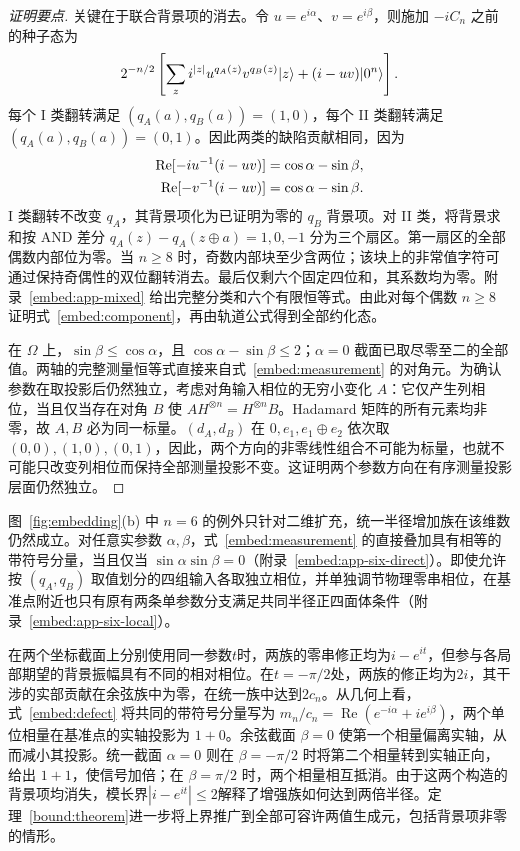 \begin{proof}[证明要点]
关键在于联合背景项的消去。令 $u=e^{i\alpha}$、$v=e^{i\beta}$，则施加 $-iC_n$ 之前的种子态为
\begin{equation}
 2^{-n/2}\left[\sum_z i^{|z|}u^{q_A(z)}v^{q_B(z)}\lvert z\rangle
 +(i-uv)\lvert 0^n\rangle\right].
 \label{embed:seed}
\end{equation}
每个 I 类翻转满足 $(q_A(a),q_B(a))=(1,0)$，每个 II 类翻转满足 $(q_A(a),q_B(a))=(0,1)$。因此两类的缺陷贡献相同，因为
\begin{align}
 \operatorname{Re}[-iu^{-1}(i-uv)]
 &=\cos\alpha-\sin\beta,\notag\\
 \operatorname{Re}[-v^{-1}(i-uv)]
 &=\cos\alpha-\sin\beta.
 \label{embed:defect}
\end{align}
I 类翻转不改变 $q_A$，其背景项化为已证明为零的 $q_B$ 背景项。对 II 类，将背景求和按 AND 差分 $q_A(z)-q_A(z\oplus a)=1,0,-1$ 分为三个扇区。第一扇区的全部偶数内部位为零。当 $n\ge8$ 时，奇数内部块至少含两位；该块上的非常值字符可通过保持奇偶性的双位翻转消去。最后仅剩六个固定四位和，其系数均为零。附录~\ref{embed:app-mixed} 给出完整分类和六个有限恒等式。由此对每个偶数 $n\ge8$ 证明式~\eqref{embed:component}，再由轨道公式得到全部约化态。

在 $\Omega$ 上，$\sin\beta\le\cos\alpha$，且 $\cos\alpha-\sin\beta\le2$；$\alpha=0$ 截面已取尽零至二的全部值。两轴的完整测量恒等式直接来自式~\eqref{embed:measurement} 的对角元。为确认参数在取投影后仍然独立，考虑对角输入相位的无穷小变化 $A$：它仅产生列相位，当且仅当存在对角 $B$ 使 $AH^{\otimes n}=H^{\otimes n}B$。Hadamard 矩阵的所有元素均非零，故 $A,B$ 必为同一标量。$(d_A,d_B)$ 在 $0,e_1,e_1\oplus e_2$ 依次取 $(0,0),(1,0),(0,1)$，因此，两个方向的非零线性组合不可能为标量，也就不可能只改变列相位而保持全部测量投影不变。这证明两个参数方向在有序测量投影层面仍然独立。
\end{proof}

图~\ref{fig:embedding}(b) 中 $n=6$ 的例外只针对二维扩充，统一半径增加族在该维数仍然成立。对任意实参数 $\alpha,\beta$，式~\eqref{embed:measurement} 的直接叠加具有相等的带符号分量，当且仅当 $\sin\alpha\sin\beta=0$（附录~\ref{embed:app-six-direct}）。即使允许按 $(q_A,q_B)$ 取值划分的四组输入各取独立相位，并单独调节物理零串相位，在基准点附近也只有原有两条单参数分支满足共同半径正四面体条件（附录~\ref{embed:app-six-local}）。

在两个坐标截面上分别使用同一参数$t$时，两族的零串修正均为$i-e^{it}$，但参与各局部期望的背景振幅具有不同的相对相位。在$t=-\pi/2$处，两族的修正均为$2i$，其干涉的实部贡献在余弦族中为零，在统一族中达到$2c_n$。从几何上看，式~\eqref{embed:defect} 将共同的带符号分量写为 $m_n/c_n=\operatorname{Re}(e^{-i\alpha}+ie^{i\beta})$，两个单位相量在基准点的实轴投影为 $1+0$。余弦截面 $\beta=0$ 使第一个相量偏离实轴，从而减小其投影。统一截面 $\alpha=0$ 则在 $\beta=-\pi/2$ 时将第二个相量转到实轴正向，给出 $1+1$，使信号加倍；在 $\beta=\pi/2$ 时，两个相量相互抵消。由于这两个构造的背景项均消失，模长界$|i-e^{it}|\le2$解释了增强族如何达到两倍半径。定理~\ref{bound:theorem}进一步将上界推广到全部可容许两值生成元，包括背景项非零的情形。
